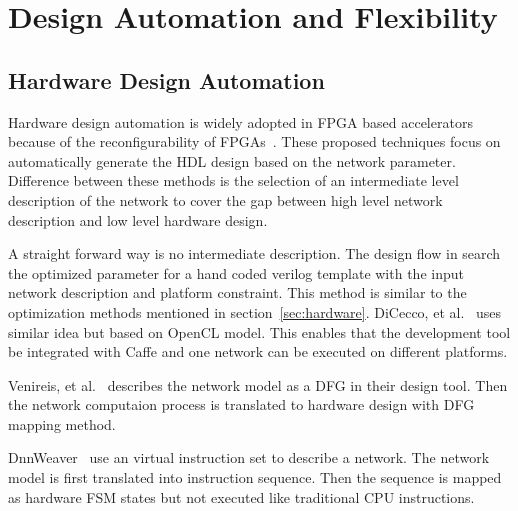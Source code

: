\section{Design Automation and Flexibility}\label{sec:flexibility}


\subsection{Hardware Design Automation}
Hardware design automation is widely adopted in FPGA based accelerators because of the reconfigurability of FPGAs~\cite{venieris2017fpgaconvnet, morcel2017minimalist, ma2017automatic, venieris2017latency, dicecco2016caffeinated, wang2016deepburning, sharma2016high}. These proposed techniques focus on automatically generate the HDL design based on the network parameter. Difference between these methods is the selection of an intermediate level description of the network to cover the gap between high level network description and low level hardware design.

A straight forward way is no intermediate description. The design flow in \cite{ma2017automatic} search the optimized parameter for a hand coded verilog template with the input network description and platform constraint. This method is similar to the optimization methods mentioned in section~\ref{sec:hardware}. DiCecco, et al.~\cite{dicecco2016caffeinated} uses similar idea but based on OpenCL model. This enables that the development tool be integrated with Caffe and one network can be executed on different platforms. 

Venireis, et al.~\cite{venieris2017latency} describes the network model as a DFG in their design tool. Then the network computaion process is translated to hardware design with DFG mapping method.

DnnWeaver~\cite{sharma2016high} use an virtual instruction set to describe a network. The network model is first translated into instruction sequence. Then the sequence is mapped as hardware FSM states but not executed like traditional CPU instructions. 

